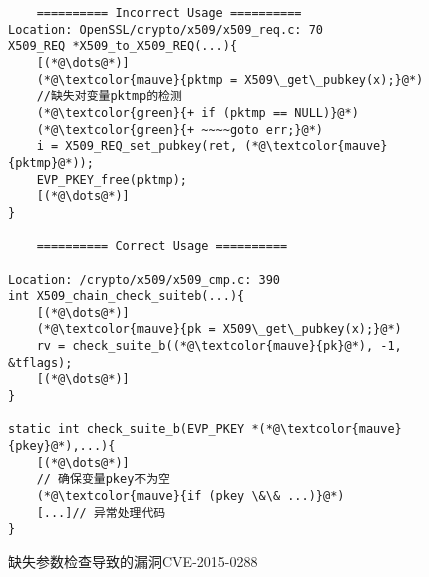 \begin{figure}
	\centering
	\begin{minipage}[t]{0.8\linewidth}
\begin{lstlisting}
	========== Incorrect Usage ==========
Location: OpenSSL/crypto/x509/x509_req.c: 70
X509_REQ *X509_to_X509_REQ(...){
	[(*@\dots@*)]
	(*@\textcolor{mauve}{pktmp = X509\_get\_pubkey(x);}@*)
	//缺失对变量pktmp的检测
	(*@\textcolor{green}{+ if (pktmp == NULL)}@*)
	(*@\textcolor{green}{+ ~~~~goto err;}@*)
	i = X509_REQ_set_pubkey(ret, (*@\textcolor{mauve}{pktmp}@*));
	EVP_PKEY_free(pktmp);
	[(*@\dots@*)]
}

	========== Correct Usage ==========

Location: /crypto/x509/x509_cmp.c: 390
int X509_chain_check_suiteb(...){
	[(*@\dots@*)]
	(*@\textcolor{mauve}{pk = X509\_get\_pubkey(x);}@*)
	rv = check_suite_b((*@\textcolor{mauve}{pk}@*), -1, &tflags);
	[(*@\dots@*)]
} 

static int check_suite_b(EVP_PKEY *(*@\textcolor{mauve}{pkey}@*),...){
	[(*@\dots@*)]
	// 确保变量pkey不为空
	(*@\textcolor{mauve}{if (pkey \&\& ...)}@*)
	[...]// 异常处理代码
}
\end{lstlisting}
	\caption{
	缺失参数检查导致的漏洞CVE-2015-0288~\cite{CVE-2015-0288}
	}
	\label{fig:1-1-example}
	\end{minipage}
\end{figure}